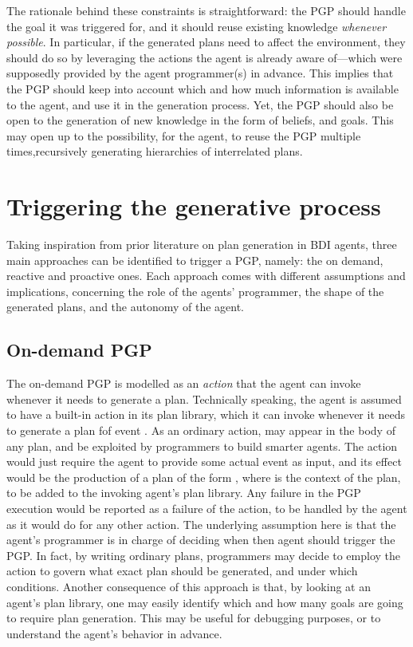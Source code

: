 \documentclass[12pt,a4paper,openright,twoside]{book}
\begin{document}
The rationale behind these constraints is straightforward: the \ac{PGP} should handle the goal it was triggered for, and it should reuse existing knowledge \emph{whenever possible}.
%
In particular, if the generated plans need to affect the environment, they should do so by leveraging the actions the agent is already aware of---which were supposedly provided by the agent programmer(s) in advance.
%
This implies that the \ac{PGP} should keep into account which and how much information is available to the agent, and use it in the generation process.
%
Yet, the \ac{PGP} should also be open to the generation of new knowledge in the form of beliefs, and goals.
%
This may open up to the possibility, for the agent, to reuse the \ac{PGP} multiple times,recursively generating hierarchies of interrelated plans.

\section{Triggering the generative process}\label{sec:triggering-generative-process}

Taking inspiration from prior literature on plan generation in \ac{BDI} agents, three main approaches can be identified to trigger a \ac{PGP}, namely: the on demand, reactive and proactive ones. 
%
Each approach comes with different assumptions and implications, concerning the role of the agents' programmer, the shape of the generated plans, and the autonomy of the agent.

\subsection{On-demand PGP}

The on-demand \ac{PGP} is modelled as an \emph{action} that the agent can invoke whenever it needs to generate a plan.
%
Technically speaking, the agent is assumed to have a built-in action  in its plan library, which it can invoke whenever it needs to generate a plan fof event .
%
As an ordinary \agentspeak{} action,  may appear in the body of any plan, and be exploited by programmers to build smarter agents.
%
The action would just require the agent to provide some actual event  as input, and its effect would be the production of a plan of the form , where  is the context of the plan, to be added to the invoking agent's plan library.
%
Any failure in the \ac{PGP} execution would be reported as a failure of the action, to be handled by the agent as it would do for any other action.
%
The underlying assumption here is that the agent's programmer is in charge of deciding when then agent should trigger the \ac{PGP}.
%
In fact, by writing ordinary \agentspeak{} plans, programmers may decide to employ the  action to govern what exact plan should be generated, and under which conditions.
%
Another consequence of this approach is that, by looking at an agent's plan library, one may easily identify which and how many goals are going to require plan generation.
%
This may be useful for debugging purposes, or to understand the agent's behavior in advance.
\end{document}
